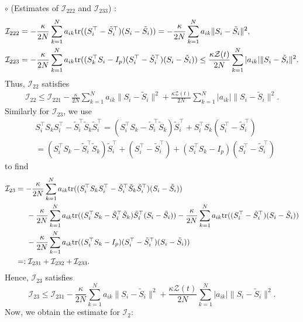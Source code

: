 \documentclass[11pt,reqno]{amsart}
\numberwithin{figure}{section}
\newcommand{\kp}{\kappa}
\newcommand{\tr}{{\textup{tr}}}
\begin{document}
$\circ$ (Estimates of $\mathcal I_{222}$ and $\mathcal I_{233}$) : 
\begin{align*}
\mathcal I_{222} & = -\frac{\kp}{2N} \sum_{k=1}^N a_{ik} \tr(( S_i^\top -\tilde S_i^\top)(S_i - \tilde S_i)) = -\frac{\kp}{2N} \sum_{k=1}^N a_{ik} \|S_i  - \tilde S_i\|^2 , \\
\mathcal I_{223} & =  -\frac{\kp}{2N} \sum_{k=1}^N a_{ik} \tr(( S_k^\top S_i - I_p)(S_i^\top - \tilde S_i^\top)(S_i-\tilde S_i))  \leq \frac{\kp \mathcal Z(t)}{2N} \sum_{k=1}^N |a_{ik} | \|S_i - \tilde S_i\|^2 .
\end{align*}
Thus, $\mathcal I_{22}$ satisfies
\begin{align*}
\mathcal I_{22} \leq \mathcal I_{221}   -\frac{\kp}{2N} \sum_{k=1}^N a_{ik} \|S_i  - \tilde S_i\|^2 + \frac{\kp \mathcal Z(t)}{2N} \sum_{k=1}^N |a_{ik} | \|S_i - \tilde S_i\|^2.
\end{align*}
Similarly for $\mathcal I_{23}$, we use 
\begin{align*}
&S_i^\top S_k S_i^\top - \tilde S_i^\top \tilde S_k  \tilde S_i^\top =( S_i^\top S_k - \tilde S_i^\top \tilde S_k) \tilde S_i^\top  +  S_i^\top S_k ( S_i^\top  - \tilde S_i^\top)   \\
& = ( S_i^\top S_k - \tilde S_i^\top \tilde S_k) \tilde S_i^\top + (S_i^\top - \tilde S_i^\top) + (S_i^\top S_k - I_p)(S_i^\top - \tilde S_i^\top) 
\end{align*}
to find
\begin{align*}
\mathcal I_{23} &=  -\frac{\kp}{2N} \sum_{k=1}^N a_{ik} \tr(( S_i^\top S_k S_i^\top - \tilde S_i^\top \tilde S_k \tilde S_i^\top)(S_i - \tilde S_i)) \\
& \hspace{0.5cm} -\frac{\kp}{2N} \sum_{k=1}^N a_{ik} \tr(( S_i^\top S_k - \tilde S_i^\top \tilde S_k)\tilde S_i^\top ( S_i - \tilde S_i))  -\frac{\kp}{2N} \sum_{k=1}^N a_{ik} \tr(( S_i^\top - \tilde S_i^\top )(S_i - \tilde S_i)) \\
& \hspace{0.5cm}-\frac{\kp}{2N} \sum_{k=1}^N a_{ik} \tr(( S_i^\top S_k - I_p) (S_i^\top - \tilde S_i^\top )(S_i - \tilde S_i))  \\
& =: \mathcal I_{231} + \mathcal I_{232} + \mathcal I_{233} .
\end{align*}
Hence, $\mathcal I_{23}$ satisfies
\[
\mathcal I_{23} \leq \mathcal I_{231}   -\frac{\kp}{2N} \sum_{k=1}^N a_{ik} \|S_i  - \tilde S_i\|^2 + \frac{\kp \mathcal Z(t)}{2N} \sum_{k=1}^N |a_{ik} | \|S_i - \tilde S_i\|^2.
\] 
Now, we obtain the estimate for $\mathcal I_2$:
\end{document}
